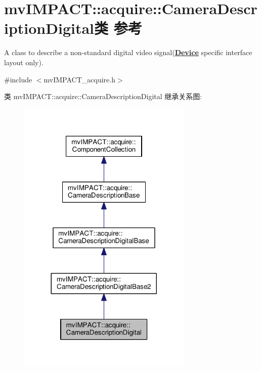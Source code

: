 \hypertarget{classmv_i_m_p_a_c_t_1_1acquire_1_1_camera_description_digital}{\section{mv\+I\+M\+P\+A\+C\+T\+:\+:acquire\+:\+:Camera\+Description\+Digital类 参考}
\label{classmv_i_m_p_a_c_t_1_1acquire_1_1_camera_description_digital}
}


A class to describe a non-\/standard digital video signal({\bfseries \hyperlink{classmv_i_m_p_a_c_t_1_1acquire_1_1_device}{Device}} specific interface layout only).  




{\ttfamily \#include $<$mv\+I\+M\+P\+A\+C\+T\+\_\+acquire.\+h$>$}



类 mv\+I\+M\+P\+A\+C\+T\+:\+:acquire\+:\+:Camera\+Description\+Digital 继承关系图\+:
\nopagebreak
\begin{figure}[H]
\begin{center}
\leavevmode
\includegraphics[width=236pt]{classmv_i_m_p_a_c_t_1_1acquire_1_1_camera_description_digital__inherit__graph}
\end{center}
\end{figure}



